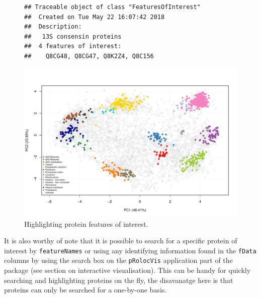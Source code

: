 \begin{figure}[!ht]
  \centering
\begin{knitrout}
\color{fgcolor}\begin{kframe}
\begin{alltt}
 \hlkwb{<-} \hlstd{(}\hlstd{,} \hlstd{,} \hlstd{,} \hlstd{)}
 \hlkwb{<-} \hlstd{(} \hlstd{=} \hlstd{,}
                              
                              
\end{alltt}
\begin{verbatim}
## Traceable object of class "FeaturesOfInterest"
##  Created on Tue May 22 16:07:42 2018 
##  Description:
##   13S consensin proteins
##  4 features of interest:
##    Q8CG48, Q8CG47, Q8K2Z4, Q8C156
\end{verbatim}
\begin{alltt}
  \hlstd{=} \hlstd{)}
\end{alltt}
\end{kframe}
\includegraphics[width=.8\textwidth]{figure/foi-1} 

\end{knitrout}
  \caption{Highlighting protein features of interest.}
  \label{fig:foi}
\end{figure}


\bigskip

It is also worthy of note that it is possible to search for a
specific protein of interest by \texttt{featureNames} or using any
identifying information found in the \texttt{fData} columns by using
the search box on the \texttt{pRolocVis} application part of the
 package (see section on interactive
visualisation). This can be handy for quickly searching and
highlighting proteins on the fly, the disavanatge here is that
proteins can only be searched for a one-by-one basis.

